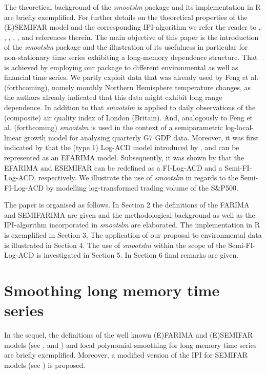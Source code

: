 \documentclass[12pt]{article}
\begin{document}
The theoretical background of the \textit{smootslm} package and its implementation in R are briefly exemplified. For further details on the theoretical properties of the (E)SEMIFAR model and the corresponding IPI-algorithm we refer the reader to \citet{beran1999semifar}, \citet{beran2002semifar}, \citet{beran2002iterative}, \citet{beran2002local}, \citet{beran2015modelling}, \citet{beran2016long} and references therein. The main objective of this paper is the introduction of the \textit{smootslm} package and the illustration of its usefulness in particular for non-stationary time series exhibiting a long-memory dependence structure. That is achieved by employing our package to different environmental as well as financial time series. We partly exploit data that was already used by Feng et al. (forthcoming), namely monthly Northern Hemisphere temperature changes, as the authors already indicated that this data might exhibit long range dependence. In addition to that \textit{smootslm} is applied to daily observations of the (composite) air quality index of London (Britain). And, analogously to Feng et al. (forthcoming) \textit{smootslm} is used in the context of a semiparametric log-local-linear growth model for analysing quarterly G7 GDP data. Moreover, it was first indicated by \citet{beran2015modelling} that the (type 1) Log-ACD model introduced by \citet{bauwens2000logarithmic}, \citet{bauwens2008moments} and \citet{karanasos2008statistical} can be represented as an EFARIMA model. Subsequently, it was shown by \citet{feng2015forecasting} that the EFARIMA and ESEMIFAR can be redefined as a FI-Log-ACD and a Semi-FI-Log-ACD, respectively. We illustrate the use of \textit{smootslm} in regards to the Semi-FI-Log-ACD by modelling log-transformed trading volume of the S\&P500.

The paper is organised as follows. In Section 2 the definitions of the FARIMA and SEMIFARIMA are given and the methodological background as well as the IPI-algorithm incorporated in \textit{smootslm} are elaborated. The implementation in R is exemplified in Section 3. The application of our proposal to environmental data is illustrated in Section 4. The use of \textit{smootslm} within the scope of the Semi-FI-Log-ACD is investigated in Section 5. In Section 6 final remarks are given.

\section{Smoothing long memory time series}
In the sequel, the definitions of the well known (E)FARIMA and (E)SEMIFAR models (see \cite{beran1999semifar}, \cite{beran2002semifar} and \cite{beran2015modelling}) and local polynomial smoothing for long memory time series are briefly exemplified. Moreover, a modified version of the 
IPI for SEMIFAR models (see \cite{beran2002iterative}) is proposed.
\end{document}
